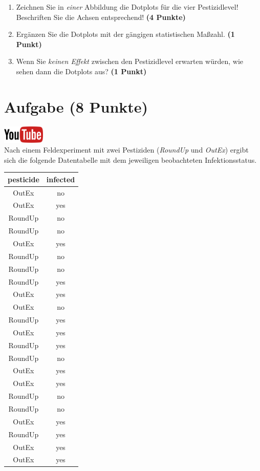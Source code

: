 \documentclass[a4paper, 10pt]{scrartcl}\usepackage[]{graphicx}\usepackage[]{xcolor}
\begin{document}
\begin{enumerate}
\item Zeichnen Sie in \textit{einer} Abbildung die Dotplots f{\"u}r die
  vier Pestizidlevel! Beschriften Sie die Achsen entsprechend!
  \textbf{(4 Punkte)}
\item Erg{\"a}nzen Sie die Dotplots mit der g{\"a}ngigen
  statistischen Ma{\ss}zahl. \textbf{(1 Punkt)}
\item Wenn Sie \textit{keinen Effekt} zwischen den Pestizidlevel erwarten
  w{\"u}rden, wie sehen dann die Dotplots aus? \textbf{(1 Punkt)}
\end{enumerate} 
\clearpage

\section{Aufgabe \hfill (8 Punkte)}

\hfill\href{https://youtu.be/t_1KL77mfmg}{\includegraphics[width =
  2cm]{img/youtube}}\\[1Ex]

Nach einem Feldexperiment mit zwei Pestiziden (\textit{RoundUp} und
\textit{OutEx}) ergibt sich die folgende Datentabelle mit dem jeweiligen
beobachteten Infektionsstatus.

\begin{table}[!h]
\centering
\begin{tabular}{cc}
\toprule
pesticide & infected\\
\midrule
OutEx & no\\
OutEx & yes\\
RoundUp & no\\
RoundUp & no\\
OutEx & yes\\
\addlinespace
RoundUp & no\\
RoundUp & no\\
RoundUp & yes\\
OutEx & yes\\
OutEx & no\\
\addlinespace
RoundUp & yes\\
OutEx & yes\\
RoundUp & yes\\
RoundUp & no\\
OutEx & yes\\
\addlinespace
OutEx & yes\\
RoundUp & no\\
RoundUp & no\\
OutEx & yes\\
RoundUp & yes\\
\addlinespace
OutEx & yes\\
OutEx & yes\\
\bottomrule
\end{tabular}
\end{table}
\end{document}
